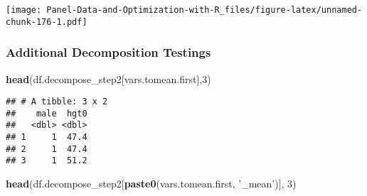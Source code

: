 \documentclass[
]{book}
\newenvironment{Shaded}{\begin{snugshade}}{\end{snugshade}}
\newcommand{\DataTypeTok}[1]{\textcolor[rgb]{0.13,0.29,0.53}{#1}}
\newcommand{\DecValTok}[1]{\textcolor[rgb]{0.00,0.00,0.81}{#1}}
\newcommand{\KeywordTok}[1]{\textcolor[rgb]{0.13,0.29,0.53}{\textbf{#1}}}
\newcommand{\NormalTok}[1]{#1}
\newcommand{\OperatorTok}[1]{\textcolor[rgb]{0.81,0.36,0.00}{\textbf{#1}}}
\newcommand{\StringTok}[1]{\textcolor[rgb]{0.31,0.60,0.02}{#1}}
\begin{document}
\begin{Shaded}
\end{Shaded}

\texttt{[image: Panel-Data-and-Optimization-with-R\_files/figure-latex/unnamed-chunk-176-1.pdf]}

\hypertarget{additional-decomposition-testings}{%
\subsubsection{Additional Decomposition Testings}\label{additional-decomposition-testings}}

\begin{Shaded}
\begin{Highlighting}[]
\KeywordTok{head}\NormalTok{(df.decompose_step2[vars.tomean.first],}\DecValTok{3}\NormalTok{)}
\end{Highlighting}
\end{Shaded}

\begin{verbatim}
## # A tibble: 3 x 2
##    male  hgt0
##   <dbl> <dbl>
## 1     1  47.4
## 2     1  47.4
## 3     1  51.2
\end{verbatim}

\begin{Shaded}
\begin{Highlighting}[]
\KeywordTok{head}\NormalTok{(df.decompose_step2[}\KeywordTok{paste0}\NormalTok{(vars.tomean.first, }\StringTok{'_mean'}\NormalTok{)], }\DecValTok{3}\NormalTok{)}
\end{Highlighting}
\end{Shaded}
\end{document}
